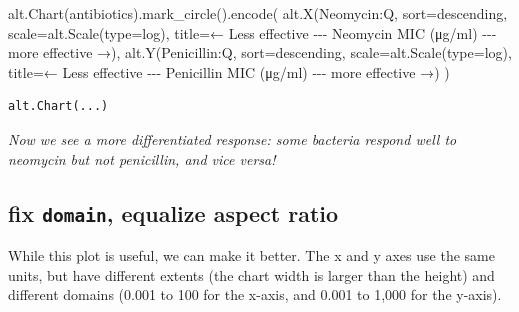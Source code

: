 \documentclass[
  letterpaper,
  DIV=11,
  numbers=noendperiod]{scrartcl}
\newenvironment{Shaded}{\begin{snugshade}}{\end{snugshade}}
\newcommand{\BuiltInTok}[1]{\textcolor[rgb]{0.00,0.23,0.31}{#1}}
\newcommand{\NormalTok}[1]{\textcolor[rgb]{0.00,0.23,0.31}{#1}}
\newcommand{\OperatorTok}[1]{\textcolor[rgb]{0.37,0.37,0.37}{#1}}
\newcommand{\StringTok}[1]{\textcolor[rgb]{0.13,0.47,0.30}{#1}}
\begin{document}
\begin{Shaded}
\begin{Highlighting}[]
\NormalTok{alt.Chart(antibiotics).mark\_circle().encode(}
\NormalTok{    alt.X(}\StringTok{\textquotesingle{}Neomycin:Q\textquotesingle{}}\NormalTok{,}
\NormalTok{          sort}\OperatorTok{=}\StringTok{\textquotesingle{}descending\textquotesingle{}}\NormalTok{,}
\NormalTok{          scale}\OperatorTok{=}\NormalTok{alt.Scale(}\BuiltInTok{type}\OperatorTok{=}\StringTok{\textquotesingle{}log\textquotesingle{}}\NormalTok{),}
\NormalTok{          title}\OperatorTok{=}\StringTok{\textquotesingle{}← Less effective {-}{-}{-} Neomycin MIC (μg/ml) {-}{-}{-} more effective →\textquotesingle{}}\NormalTok{),}
\NormalTok{    alt.Y(}\StringTok{\textquotesingle{}Penicillin:Q\textquotesingle{}}\NormalTok{,}
\NormalTok{          sort}\OperatorTok{=}\StringTok{\textquotesingle{}descending\textquotesingle{}}\NormalTok{,}
\NormalTok{          scale}\OperatorTok{=}\NormalTok{alt.Scale(}\BuiltInTok{type}\OperatorTok{=}\StringTok{\textquotesingle{}log\textquotesingle{}}\NormalTok{),}
\NormalTok{          title}\OperatorTok{=}\StringTok{\textquotesingle{}← Less effective {-}{-}{-} Penicillin MIC (μg/ml) {-}{-}{-} more effective →\textquotesingle{}}\NormalTok{)}
\NormalTok{)}
\end{Highlighting}
\end{Shaded}

\begin{verbatim}
alt.Chart(...)
\end{verbatim}

\emph{Now we see a more differentiated response: some bacteria respond
well to neomycin but not penicillin, and vice versa!}

\subsection{\texorpdfstring{fix \texttt{domain}, equalize aspect
ratio}{fix domain, equalize aspect ratio}}\label{fix-domain-equalize-aspect-ratio}

While this plot is useful, we can make it better. The x and y axes use
the same units, but have different extents (the chart width is larger
than the height) and different domains (0.001 to 100 for the x-axis, and
0.001 to 1,000 for the y-axis).
\end{document}
